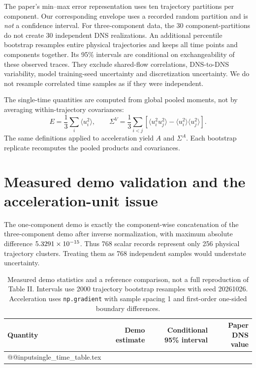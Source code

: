\documentclass[10pt,a4paper]{article}
\begin{document}
The paper's min--max error representation uses ten trajectory partitions per component. Our corresponding envelope uses a recorded random partition and is \emph{not} a confidence interval. For three-component data, the 30 component-partitions do not create 30 independent DNS realizations. An additional percentile bootstrap resamples entire physical trajectories and keeps all time points and components together. Its 95\% intervals are conditional on exchangeability of these observed traces. They exclude shared-flow correlations, DNS-to-DNS variability, model training-seed uncertainty and discretization uncertainty. We do not resample correlated time samples as if they were independent.

The single-time quantities are computed from global pooled moments, not by averaging within-trajectory covariances:
\begin{equation}
E=\frac13\sum_i\langle u_i^2\rangle,\qquad
\Sigma^V=\frac13\sum_{i<j}\left[\langle u_i^2u_j^2\rangle-\langle u_i^2\rangle\langle u_j^2\rangle\right].
\end{equation}
The same definitions applied to acceleration yield $A$ and $\Sigma^A$. Each bootstrap replicate recomputes the pooled products and covariances.

\section{Measured demo validation and the acceleration-unit issue}
The one-component demo is exactly the component-wise concatenation of the three-component demo after inverse normalization, with maximum absolute difference $5.3291\times10^{-15}$. Thus 768 scalar records represent only 256 physical trajectory clusters. Treating them as 768 independent samples would understate uncertainty.

\begin{table}[ht]
\centering\small
\begin{tabular}{lrrr}
\toprule Quantity & Demo estimate & Conditional 95\% interval & Paper DNS value\\\midrule
\csname @@input\endcsname single_time_table.tex
\bottomrule
\end{tabular}
\caption{Measured demo statistics and a reference comparison, not a full reproduction of Table II. Intervals use 2000 trajectory bootstrap resamples with seed 20261026. Acceleration uses \texttt{np.gradient} with sample spacing 1 and first-order one-sided boundary differences.}
\label{tab:single}
\end{table}
\end{document}
